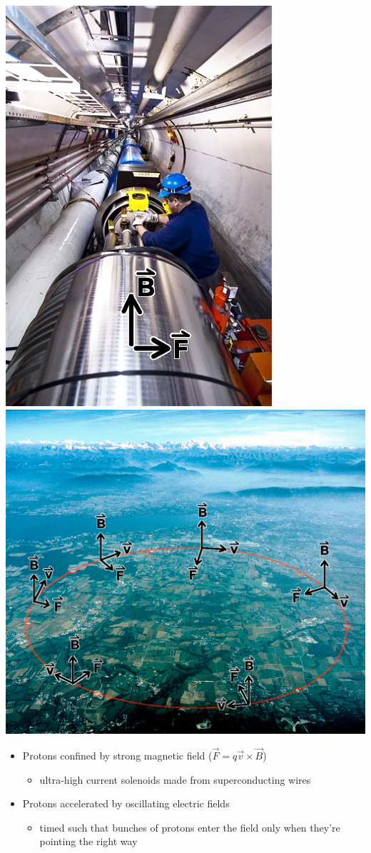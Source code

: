 \documentclass[compress]{beamer}
\begin{document}
\begin{frame}
\vspace{0.5 cm}
\includegraphics[height=6 cm]{lhc_dipole.jpg} \hfill
\includegraphics[height=6 cm]{cernpanorama_bfield.jpg} \hfill
\begin{itemize}
\item Protons confined by strong magnetic field ($\vec{F} = q\vec{v} \times \vec{B}$)
\begin{itemize}
\item ultra-high current solenoids made from superconducting wires
\end{itemize}

\item Protons accelerated by oscillating electric fields
\begin{itemize}
\item timed such that bunches of protons enter the field only when they're pointing the right way
\end{itemize}
\end{itemize}
\end{frame}
\end{document}

